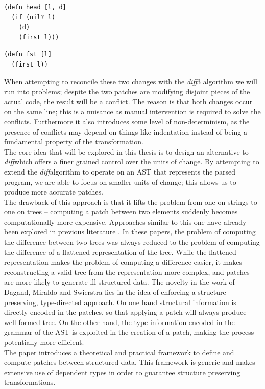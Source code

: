 \documentclass[11pt, titlepage]{article}
\newcommand{\diff}{\emph{diff}}
\begin{document}
\begin{verbatim}
(defn head [l, d]
  (if (nil? l)
    (d)
    (first l)))
\end{verbatim}

\begin{verbatim}
(defn fst [l]
  (first l))
\end{verbatim}

When attempting to reconcile these two changes with the \diff3 algorithm we will run into problems; despite the two patches are modifying disjoint pieces of the actual code, the result will be a conflict.
The reason is that both changes occur on the same line; this is a nuisance as manual intervention is required to solve the conflicts. Furthermore it also introduces some level of non-determinism, as the presence of conflicts may depend on things like indentation instead of being a fundamental property of the transformation. 
\\
The core idea that will be explored in this thesis is to design an alternative to \diff which offers a finer grained control over the units of change. By attempting to extend the \diff algorithm to operate on an AST that represents the parsed program, we are able to focus on smaller units of change; this allows us to produce more accurate patches. 
\\
The drawback of this approach is that it lifts the problem from one on strings to one on trees --
 computing a patch between two elements suddenly becomes computationally more expensive. 
Approaches similar to this one have already been explored in previous literature \cite{semantics-VC, structure-aware-VC, Vassena}. In these papers, the problem of computing the difference between two trees was always reduced to the problem of computing the difference of a flattened representation of the tree. 
While the flattened representation makes the problem of computing a difference easier, it makes reconstructing a valid tree from the representation more complex, and patches are more likely to generate ill-structured data.  
The novelty in the work of Dagand, Miraldo and Swierstra \cite{type-directed-diff} lies in the idea of enforcing a structure-preserving, type-directed approach. 
On one hand structural information is directly encoded in the patches, so that applying a patch will always produce well-formed tree. 
On the other hand, the type information encoded in the grammar of the AST is exploited in the creation of a patch, making the process potentially more efficient.
\\
The paper introduces a theoretical and practical framework to define and compute patches between structured data. This framework is generic and makes extensive use of dependent types in order to guarantee structure preserving transformations. 
\end{document}
